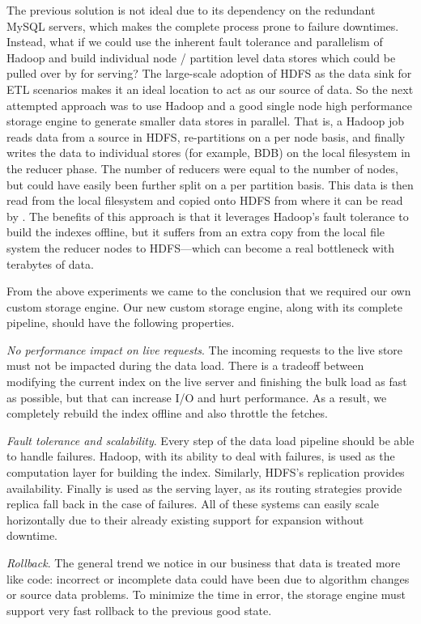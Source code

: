 The previous solution is not ideal due to its dependency on the
redundant MySQL servers, which makes the complete process prone to
failure downtimes. Instead, what if we could use the inherent fault
tolerance and parallelism of Hadoop and build individual node /
partition level data stores which could be pulled over by
\projectname{} for serving? The large-scale adoption of HDFS as the
data sink for ETL scenarios makes it an ideal location to act as our source of data.
So the next attempted approach was to use Hadoop and a good single
node high performance storage engine to generate smaller data
stores in parallel. That is, a Hadoop job reads data from a source in
HDFS, re-partitions on a per node basis, and finally writes the data
to individual stores (for example, BDB) on the local filesystem in the
reducer phase. The number of reducers were equal to the number of
nodes, but could have easily been further split on a per partition
basis. This data is then read from the local filesystem and copied
onto HDFS from where it can be read by \projectname{}. The benefits of
this approach is that it leverages Hadoop's fault tolerance to build
the indexes offline, but it suffers from an extra copy from the local
file system the reducer nodes to HDFS---which can become a real
bottleneck with terabytes of data. 

From the above experiments we came to the conclusion that we required
our own custom storage engine. Our new custom storage engine, along
with its complete pipeline, should have the following properties. 
\begin{compactitem}
\item \emph{No performance impact on live requests}. The incoming
requests to the live store must not be impacted during the data load.
There is a tradeoff between modifying the current index on the live
server and finishing the bulk load as fast as possible, but that can
increase I/O and hurt performance. As a result, we completely rebuild
the index offline and also throttle the fetches. 
\item \emph{Fault tolerance and scalability}. Every step of the data
load pipeline should be able to handle failures. Hadoop, with its
ability to deal with failures, is used as the computation layer for
building the index. Similarly, HDFS's replication provides
availability. Finally \projectname{} is used as the serving layer, as
its routing strategies provide replica fall back in the case of
failures. All of these systems can easily scale horizontally due to
their already existing support for expansion without downtime. 
\item \emph{Rollback}. The general trend we notice in our business
that data is treated more like code: incorrect or incomplete data
could have been due to algorithm changes or source data problems. To
minimize the time in error, the storage engine must support very fast
rollback to the previous good state. 
\end{compactitem}


